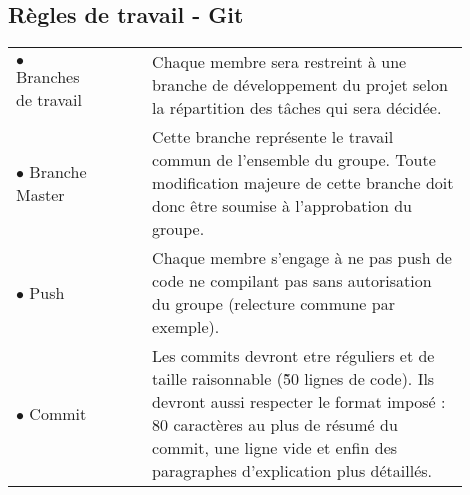 \documentclass[a4paper,11pt]{article}
\begin{document}
\begin{spacing}{1.3}
\begin{tabular}{p{0.2\linewidth} p{0.005\linewidth} p{0.7\linewidth} }
		
		\end{tabular}



                  
		\subsection*{Règles de travail - Git}
		
		\begin{tabular}{p{0.2\linewidth} p{0.005\linewidth} p{0.7\linewidth} }
		
                  $\bullet$ Branches de travail & & Chaque membre sera restreint à une branche de développement du projet selon la répartition des tâches qui sera décidée.\\[0.3cm]
		  $\bullet$ Branche Master & & Cette branche représente le travail commun de l'ensemble du groupe. Toute modification majeure de cette branche doit donc être soumise à l'approbation du groupe.\\[0.3cm]
		  $\bullet$ Push & & Chaque membre s'engage à ne pas push de code ne compilant pas sans autorisation du groupe (relecture commune par exemple).\\[0.3cm]
		$\bullet$  Commit   &  &  Les  commits   devront  etre
                  réguliers et  de taille raisonnable (\~ 50  lignes de
                  code). Ils devront aussi  respecter le format imposé
                  : 80  caractères au  plus de  résumé du  commit, une
                  ligne  vide et  enfin des  paragraphes d'explication
                  plus détaillés.

                \end{tabular}
		
		\thispagestyle{fancy}

		
	\end{spacing}
\end{document}
